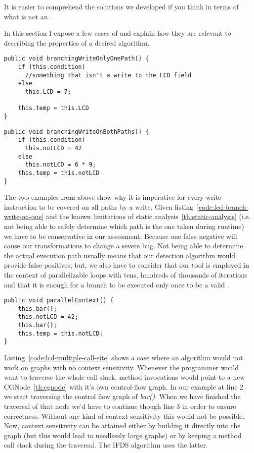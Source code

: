 It is easier to comprehend the solutions we developed if you think in
terms of what is not an \slcd.


In this section I expose a few cases of \slcds and explain how they are relevant
to describing the properties of a desired algorithm.

\begin{lstlisting}[caption={Branching instruction with a write on only one
path, this is an LCD}, label = {code:lcd-branch-write-on-one}]
public void branchingWriteOnlyOnePath() {
	if (this.condition)
      //something that isn't a write to the LCD field
    else
      this.LCD = 7;
    
    this.temp = this.LCD
}
\end{lstlisting}

\begin{lstlisting}[caption={Branching instruction with write on both paths,
this not an LCD}, label = {code:lcd-branch-write-on-both}]
public void branchingWriteOnBothPaths() {
    if (this.condition)
      this.notLCD = 42
    else
      this.notLCD = 6 * 9;
    this.temp = this.notLCD
}
\end{lstlisting}

The two examples from above show why it is imperative for every write
instruction to be covered on all paths by a write. Given
listing~\ref{code:lcd-branch-write-on-one} and the known limitations of static
analysis~\ref{th:static-analysis} (i.e. not being able to safely determine which
path is the one taken during runtime) we have to be conservative in our
assessment. Because one false negative will cause our transformations to change
a severe bug. Not being able to determine the actual execution path usually
means that our detection algorithm would provide false-positives; but, we also
have to consider that our tool is employed in the context of parallelizable
loops with tens, hundreds of thousands of iterations and that it is enough for a
branch to be executed only once to be a valid \lcd.

\begin{lstlisting}[caption={Multiple method calls, not an LCD}, label = {code:lcd-multiple-call-site}]
public void parallelContext() {
    this.bar();
    this.notLCD = 42;
    this.bar();
    this.temp = this.notLCD;
}
\end{lstlisting}

Listing~\ref{code:lcd-multiple-call-site} shows a case where an algorithm would
not work on graphs with no context sensitivity. Whenever the programmer would
want to traverse the whole call stack, method invocations would point to a new
CGNode~\ref{th:cgnode} with it's own control-flow graph. In our example at line
2 we start traversing the control flow graph of \emph{bar()}. When we have
finished the traversal of that node we'd have to continue though line 3 in
order to ensure correctness. Without any kind of context sensitivity this would
not be possible. Now, context sensitivity can be attained either by building it
directly into the graph (but this would lead to needlessly large graphs) or by
keeping a method call stack during the traversal. The IFDS algorithm uses the
latter.


